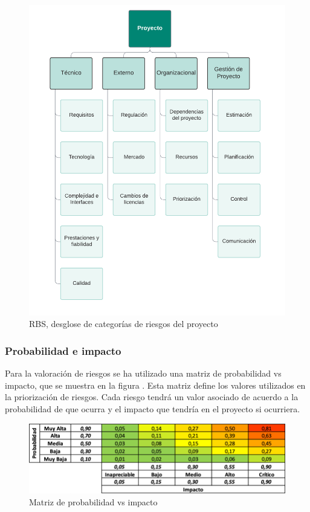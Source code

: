 \begin{figure}[H]
    \hypertarget{fig:A1_PGR_RBS}{}
    \centering
    \includegraphics[width=0.65\linewidth]{figures/A1_PGR_RBS.png}
    \caption{RBS, desglose de categorías de riesgos del proyecto}
    \label{fig:A1_PGR_RBS}
\end{figure}

\subsubsection*{Probabilidad e impacto}
Para la valoración de riesgos se ha utilizado una matriz de probabilidad vs impacto, que se muestra en la figura . 
Esta matriz define los valores utilizados en la priorización de riesgos. Cada riesgo tendrá un valor asociado de acuerdo a la probabilidad de que ocurra y el impacto que tendría en el proyecto si ocurriera.

\begin{figure}[H]
    \hypertarget{fig:A1_PGR_matriz_prob_vs_impact}{}
    \centering
    \includegraphics{figures/A1_PGR_matriz_prob_vs_impact.png}
    \caption{Matriz de probabilidad vs impacto}
    \label{fig:A1_PGR_matriz_prob_vs_impact}
\end{figure}

